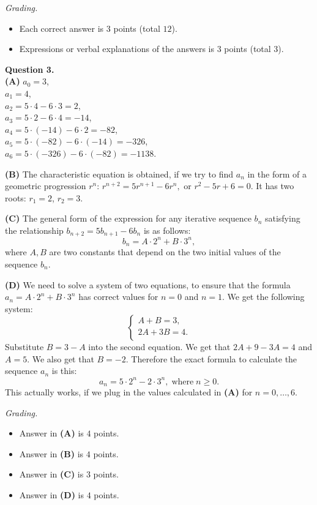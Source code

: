 \documentclass[jou]{apa6}
\begin{document}
{\scriptsize
{\em Grading.} 
\begin{itemize}
\item Each correct answer is $3$ points (total $12$).
\item Expressions or verbal explanations of the answers is $3$ points (total $3$).
\end{itemize}
}



\vspace{10pt}
{\bf Question 3.}\\
{\bf (A)} $a_0 = 3$,\\
$a_1 = 4$,\\
$a_2 = 5\cdot 4 - 6 \cdot 3 = 2$,\\
$a_3 = 5\cdot 2 - 6 \cdot 4 = -14$,\\  
$a_4 = 5\cdot(-14) - 6 \cdot 2 = -82$,\\
$a_5 = 5\cdot(-82) - 6 \cdot (-14) = -326$,\\
$a_6 = 5\cdot(-326) - 6 \cdot (-82) = -1138$.

{\bf (B)} The characteristic equation is obtained, if we try to find $a_n$ 
in the form of a geometric progression $r^n$:   
$r^{n+2} = 5r^{n+1} - 6r^n,$ or  
$r^2 -5r + 6 = 0$.   
It has two roots: $r_1 = 2$, $r_2 = 3$. 

{\bf (C)} The general form of the expression for any iterative
sequence $b_n$ satisfying the relationship $b_{n+2} = 5b_{n+1} - 6b_n$ is as follows:
$$b_n = A \cdot 2^n + B \cdot 3^n,$$
where $A,B$ are two constants that depend on the two initial values of the sequence $b_n$. 

{\bf (D)} We need to solve a system of two equations, to ensure that the formula
$a_n = A \cdot 2^n + B \cdot 3^n$ has correct values for $n=0$ and $n=1$. 
We get the following system: 
$$\left\{ \begin{array}{l} 
A + B = 3,\\
2A + 3B = 4.\\
\end{array} \right.$$
Substitute $B = 3-A$ into the second equation. We get that 
$2A + 9 - 3A = 4$ and $A = 5$. We also get that $B = -2$. 
Therefore the exact formula to calculate the sequence $a_n$ is this:
$$a_n  = 5 \cdot 2^n - 2 \cdot 3^n,\;\text{where}\;n \geq 0.$$
This actually works, if we plug in the values calculated in {\bf (A)} for $n = 0,\ldots,6$.

{\scriptsize
{\em Grading.} 
\begin{itemize}
\item Answer in {\bf (A)} is $4$ points.
\item Answer in {\bf (B)} is $4$ points.
\item Answer in {\bf (C)} is $3$ points.
\item Answer in {\bf (D)} is $4$ points.
\end{itemize}
}
\end{document}
